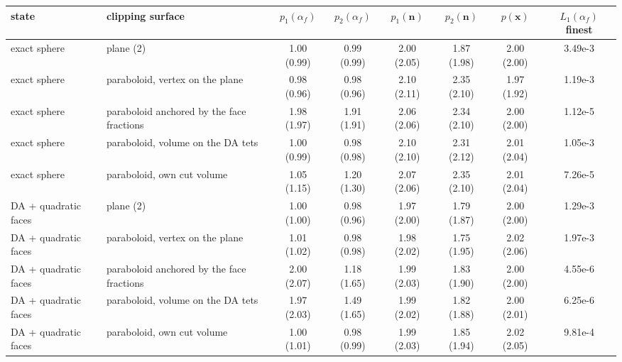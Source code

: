 \begin{tabular}{llcccccc}
\toprule
state & clipping surface & $p_1(\alpha_f)$ & $p_2(\alpha_f)$ & $p_1(\mathbf{n})$ & $p_2(\mathbf{n})$ & $p(\mathbf{x})$ & $L_1(\alpha_f)$ finest \\
\midrule
exact sphere & plane (2) & 1.00 (0.99) & 0.99 (0.99) & 2.00 (2.05) & 1.87 (1.98) & 2.00 (2.00) & 3.49e-3 \\
exact sphere & paraboloid, vertex on the plane & 0.98 (0.96) & 0.98 (0.96) & 2.10 (2.11) & 2.35 (2.10) & 1.97 (1.92) & 1.19e-3 \\
exact sphere & paraboloid anchored by the face fractions & 1.98 (1.97) & 1.91 (1.91) & 2.06 (2.06) & 2.34 (2.10) & 2.00 (2.00) & 1.12e-5 \\
exact sphere & paraboloid, volume on the DA tets & 1.00 (0.99) & 0.98 (0.98) & 2.10 (2.10) & 2.31 (2.12) & 2.01 (2.04) & 1.05e-3 \\
exact sphere & paraboloid, own cut volume & 1.05 (1.15) & 1.20 (1.30) & 2.07 (2.06) & 2.35 (2.10) & 2.01 (2.04) & 7.26e-5 \\
DA + quadratic faces & plane (2) & 1.00 (1.00) & 0.98 (0.96) & 1.97 (2.00) & 1.79 (1.87) & 2.00 (2.00) & 1.29e-3 \\
DA + quadratic faces & paraboloid, vertex on the plane & 1.01 (1.02) & 0.98 (0.98) & 1.98 (2.02) & 1.75 (1.95) & 2.02 (2.06) & 1.97e-3 \\
DA + quadratic faces & paraboloid anchored by the face fractions & 2.00 (2.07) & 1.18 (1.65) & 1.99 (2.03) & 1.83 (1.90) & 2.00 (2.00) & 4.55e-6 \\
DA + quadratic faces & paraboloid, volume on the DA tets & 1.97 (2.03) & 1.49 (1.65) & 1.99 (2.02) & 1.82 (1.88) & 2.00 (2.01) & 6.25e-6 \\
DA + quadratic faces & paraboloid, own cut volume & 1.00 (1.01) & 0.98 (0.99) & 1.99 (2.03) & 1.85 (1.94) & 2.02 (2.05) & 9.81e-4 \\
\bottomrule
\end{tabular}
